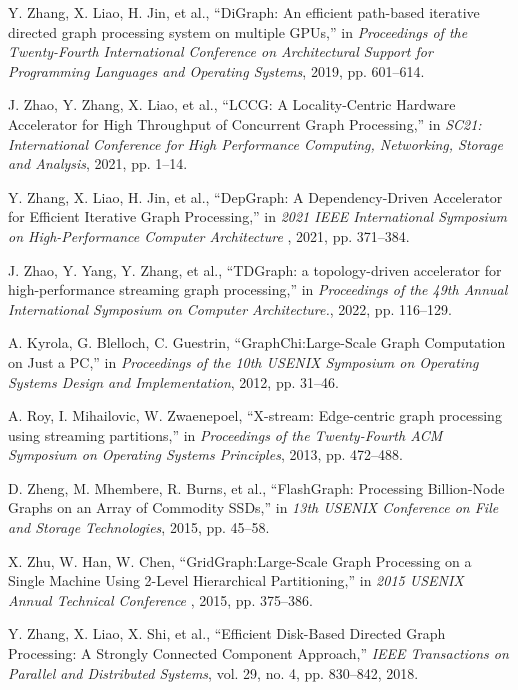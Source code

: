 \documentclass[lettersize,journal]{IEEEtran}
\begin{document}
\begin{thebibliography}{100}
Y. Zhang, X. Liao, H. Jin, et al., ``DiGraph: An efficient path-based iterative directed graph processing system on multiple GPUs,'' in \textit{Proceedings of the Twenty-Fourth International Conference on Architectural Support for Programming Languages and Operating Systems}, 2019, pp. 601--614.

J. Zhao, Y. Zhang, X. Liao, et al., ``LCCG: A Locality-Centric Hardware Accelerator for High Throughput of Concurrent Graph Processing,'' in \textit{SC21: International Conference for High Performance Computing, Networking, Storage and Analysis}, 2021, pp. 1--14.

Y. Zhang, X. Liao, H. Jin, et al., ``DepGraph: A Dependency-Driven Accelerator for Efficient Iterative Graph Processing,'' in \textit{2021 IEEE International Symposium on High-Performance Computer Architecture }, 2021, pp. 371--384.

J. Zhao, Y. Yang, Y. Zhang, et al., ``TDGraph: a topology-driven accelerator for high-performance streaming graph processing,'' in \textit{Proceedings of the 49th Annual International Symposium on Computer Architecture.}, 2022, pp. 116--129.

A. Kyrola, G. Blelloch, C. Guestrin, ``{GraphChi}:{Large-Scale} Graph Computation on Just a {PC},'' in \textit{Proceedings of the 10th USENIX Symposium on Operating Systems Design and Implementation}, 2012, pp. 31--46.

A. Roy, I. Mihailovic, W. Zwaenepoel,  ``X-stream: Edge-centric graph processing using streaming partitions,'' in \textit{Proceedings of the Twenty-Fourth ACM Symposium on Operating Systems Principles}, 2013, pp. 472--488.

D. Zheng, M. Mhembere, R. Burns, et al., ``{FlashGraph}: Processing {Billion-Node} Graphs on an Array of Commodity {SSDs},'' in \textit{13th USENIX Conference on File and Storage Technologies}, 2015, pp. 45--58.

X. Zhu, W. Han, W. Chen, ``{GridGraph}:{Large-Scale} Graph Processing on a Single Machine Using 2-Level Hierarchical Partitioning,'' in \textit{2015 USENIX Annual Technical Conference }, 2015, pp. 375--386.

Y. Zhang, X. Liao, X. Shi, et al., ``Efficient Disk-Based Directed Graph Processing: A Strongly Connected Component Approach,'' \textit{IEEE Transactions on Parallel and Distributed Systems}, vol. 29, no. 4, pp. 830--842, 2018.


\end{thebibliography}
\end{document}

